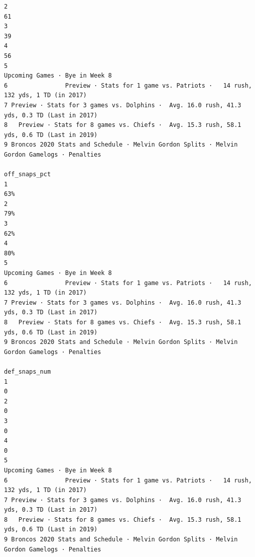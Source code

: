 \documentclass[
]{article}
\begin{document}
\begin{verbatim}
2                                                                                          61
3                                                                                          39
4                                                                                          56
5                                                              Upcoming Games · Bye in Week 8
6                Preview · Stats for 1 game vs. Patriots ·   14 rush, 132 yds, 1 TD (in 2017)
7 Preview · Stats for 3 games vs. Dolphins ·  Avg. 16.0 rush, 41.3 yds, 0.3 TD (Last in 2017)
8   Preview · Stats for 8 games vs. Chiefs ·  Avg. 15.3 rush, 58.1 yds, 0.6 TD (Last in 2019)
9 Broncos 2020 Stats and Schedule · Melvin Gordon Splits · Melvin Gordon Gamelogs · Penalties
                                                                                off_snaps_pct
1                                                                                         63%
2                                                                                         79%
3                                                                                         62%
4                                                                                         80%
5                                                              Upcoming Games · Bye in Week 8
6                Preview · Stats for 1 game vs. Patriots ·   14 rush, 132 yds, 1 TD (in 2017)
7 Preview · Stats for 3 games vs. Dolphins ·  Avg. 16.0 rush, 41.3 yds, 0.3 TD (Last in 2017)
8   Preview · Stats for 8 games vs. Chiefs ·  Avg. 15.3 rush, 58.1 yds, 0.6 TD (Last in 2019)
9 Broncos 2020 Stats and Schedule · Melvin Gordon Splits · Melvin Gordon Gamelogs · Penalties
                                                                                def_snaps_num
1                                                                                           0
2                                                                                           0
3                                                                                           0
4                                                                                           0
5                                                              Upcoming Games · Bye in Week 8
6                Preview · Stats for 1 game vs. Patriots ·   14 rush, 132 yds, 1 TD (in 2017)
7 Preview · Stats for 3 games vs. Dolphins ·  Avg. 16.0 rush, 41.3 yds, 0.3 TD (Last in 2017)
8   Preview · Stats for 8 games vs. Chiefs ·  Avg. 15.3 rush, 58.1 yds, 0.6 TD (Last in 2019)
9 Broncos 2020 Stats and Schedule · Melvin Gordon Splits · Melvin Gordon Gamelogs · Penalties

\end{verbatim}
\end{document}
